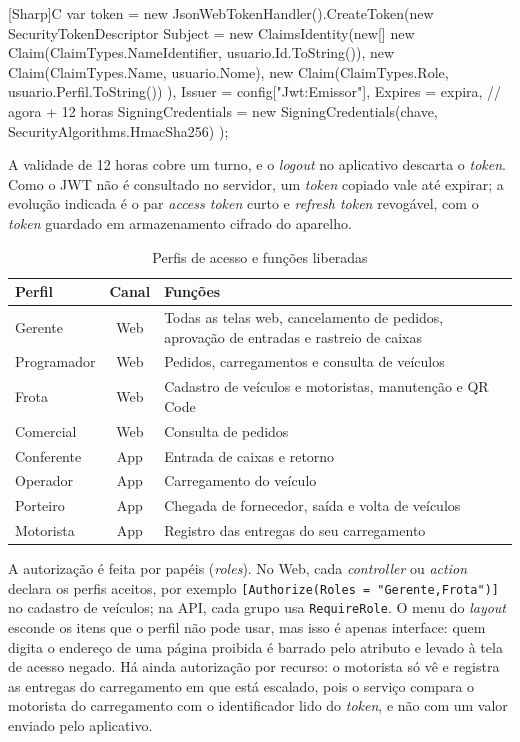 \begin{codeblock}{[Sharp]C}
var token = new JsonWebTokenHandler().CreateToken(new SecurityTokenDescriptor
{
    Subject = new ClaimsIdentity(new[] {
        new Claim(ClaimTypes.NameIdentifier, usuario.Id.ToString()),
        new Claim(ClaimTypes.Name, usuario.Nome),
        new Claim(ClaimTypes.Role, usuario.Perfil.ToString()) }),
    Issuer = config["Jwt:Emissor"],
    Expires = expira,                                   // agora + 12 horas
    SigningCredentials = new SigningCredentials(chave, SecurityAlgorithms.HmacSha256)
});
\end{codeblock}

A validade de 12 horas cobre um turno, e o \textit{logout} no aplicativo descarta o \textit{token}. Como o JWT não é consultado no servidor, um \textit{token} copiado vale até expirar; a evolução indicada é o par \textit{access token} curto e \textit{refresh token} revogável, com o \textit{token} guardado em armazenamento cifrado do aparelho.

\begin{table}[htbp]
\centering
\caption{Perfis de acesso e funções liberadas}
\label{tab:perfis}
\footnotesize
\begin{tabular}{|p{2.6cm}|c|p{10cm}|}
\hline
\textbf{Perfil} & \textbf{Canal} & \textbf{Funções} \\ \hline
Gerente & Web & Todas as telas web, cancelamento de pedidos, aprovação de entradas e rastreio de caixas \\ \hline
Programador & Web & Pedidos, carregamentos e consulta de veículos \\ \hline
Frota & Web & Cadastro de veículos e motoristas, manutenção e QR Code \\ \hline
Comercial & Web & Consulta de pedidos \\ \hline
Conferente & App & Entrada de caixas e retorno \\ \hline
Operador & App & Carregamento do veículo \\ \hline
Porteiro & App & Chegada de fornecedor, saída e volta de veículos \\ \hline
Motorista & App & Registro das entregas do seu carregamento \\ \hline
\end{tabular}
\end{table}

A autorização é feita por papéis (\textit{roles}). No Web, cada \textit{controller} ou \textit{action} declara os perfis aceitos, por exemplo \texttt{[Authorize(Roles = "Gerente,Frota")]} no cadastro de veículos; na API, cada grupo usa \texttt{RequireRole}. O menu do \textit{layout} esconde os itens que o perfil não pode usar, mas isso é apenas interface: quem digita o endereço de uma página proibida é barrado pelo atributo e levado à tela de acesso negado. Há ainda autorização por recurso: o motorista só vê e registra as entregas do carregamento em que está escalado, pois o serviço compara o motorista do carregamento com o identificador lido do \textit{token}, e não com um valor enviado pelo aplicativo.

